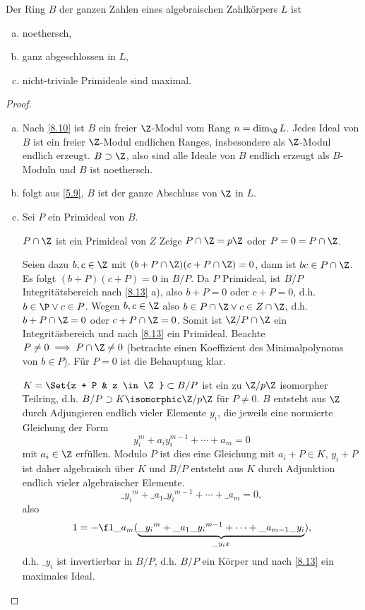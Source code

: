 \begin{st} \label{8.15}
	Der Ring $B$ der ganzen Zahlen eines algebraischen Zahlkörpers $L$ ist
	\begin{enumerate}[a)]
		\item
			noethersch,
		\item
			ganz abgeschlossen in $L$,
		\item
			nicht-triviale Primideale sind maximal.
	\end{enumerate}
	\begin{proof}
		\begin{enumerate}[a)]
			\item
				Nach \ref{8.10} ist $B$ ein freier $\Z$-Modul vom Rang $n = \dim_\Q L$.
				Jedes Ideal von $B$ ist ein freier $\Z$-Modul endlichen Ranges, insbesondere als $\Z$-Modul endlich erzeugt.
				$B \supset \Z$, also sind alle Ideale von $B$ endlich erzeugt als $B$-Moduln und $B$ ist noethersch.
			\item
				folgt aus \ref{5.9}, $B$ ist der ganze Abschluss von $\Z$ in $L$.
			\item
				Sei $P$ ein Primideal von $B$.
				\begin{seg}{$P \cap \Z$ ist ein Primideal von $Z$}
					Zeige $P \cap \Z = p\Z$ oder $P = 0 = P \cap \Z$.

					Seien dazu $b,c \in \Z$ mit $(b + P \cap \Z)(c + P \cap \Z) = 0$, dann ist $bc \in P \cap \Z$.
					Es folgt $(b + P)(c + P) = 0$ in $B / P$.
					Da $P$ Primideal, ist $B / P$ Integritätsbereich nach \ref{8.13} a), also $b + P = 0$ oder $c + P = 0$, d.h. $b \in \P \lor c \in P$.
					Wegen $b,c \in \Z$ also $b \in P \cap \Z \lor c \in Z \cap \Z$, d.h. $b + P\cap\Z = 0$ oder $c + P\cap \Z = 0$.
					Somit ist $\Z / P \cap \Z$ ein Integritäsbereich und nach \ref{8.13} ein Primideal.
					Beachte $P \neq 0 \implies P \cap \Z \neq 0$ (betrachte einen Koeffizient des Minimalpolynoms von $b \in P$).
					Für $P = 0$ ist die Behauptung klar.
				\end{seg}
				$K = \Set{z + P & z \in \Z} \subset B / P$ ist ein zu $\Z / p \Z$ isomorpher Teilring, d.h. $B / P \supset K \isomorphic \Z / p \Z$ für $P \neq 0$.
				$B$ entsteht aus $\Z$ durch Adjungieren endlich vieler Elemente $y_i$, die jeweils eine normierte Gleichung der Form
				\[
					y_i^m + a_i y_i^{m-1} + \dotsb + a_m = 0
				\]
				mit $a_i \in \Z$ erfüllen.
				Modulo $P$ ist dies eine Gleichung mit $a_i + P \in K$, $y_i + P$ ist daher algebraisch über $K$ und $B / P$ entsteht aus $K$ durch Adjunktion endlich vieler algebraischer Elemente.
				\[
					\_{y_i}^m + \_{a_1}\_{y_i}^{m-1} + \dotsb + \_{a_m} = 0,
				\]
				also
				\[
					1 = - \f 1{\_{a_m}}(\underbrace{\_{y_i}^m + \_{a_1}\_{y_i}^{m-1} + \dotsb + \_{a_{m-1}}\_{y_i}}_{\_{y_i} x}),
				\]
				d.h. $\_{y_i}$ ist invertierbar in $B / P$, d.h. $B/P$ ein Körper und nach \ref{8.13} ein maximales Ideal.
		\end{enumerate}
	\end{proof}
\end{st}

